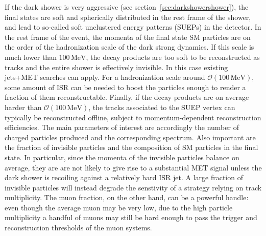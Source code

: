 \begin{enumerate}
If the dark shower is very aggressive (see section~\ref{sec:darkshowershower}), the final states are soft and spherically distributed in the rest frame of the shower, and lead to so-called soft unclustered energy patterns (SUEPs) in the detector. In the  rest frame of the event, the momenta of the final state SM particles are on the order of the hadronization scale of the dark strong dynamics. If this scale is much lower than $100\,\textrm{MeV}$, the decay products are too soft to be reconstructed as tracks and the entire shower is effectively invisible. In this case existing jets+MET searches can apply. For a hadronization scale around $\mathcal{O}(100\,\textrm{MeV})$, some amount of ISR can be needed to boost the particles enough to render a fraction of them reconstructable. Finally, if the decay products are on average harder than $\mathcal{O}(100\,\textrm{MeV})$, the tracks associated to the SUEP vertex can typically be reconstructed offline, subject to momentum-dependent reconstruction efficiencies. The main parameters of interest are accordingly the number of charged particles produced and the corresponding \pt spectrum. Also important are the fraction of invisible particles and the composition of SM particles in the final state.  In particular, since the momenta of the invisible particles balance on average, they are are not likely to give rise to a substantial MET signal unless the dark shower is recoiling against a relatively hard ISR jet. A large fraction of invisible particles will instead degrade the senstivity of a strategy relying on track multiplicity. The muon fraction, on the other hand, can be a powerful handle: even though the average muon \pt may be very low, due to the high particle multiplicity a handful of muons may still be hard enough to pass the trigger and reconstruction thresholds of the muon systems.


\end{enumerate}

